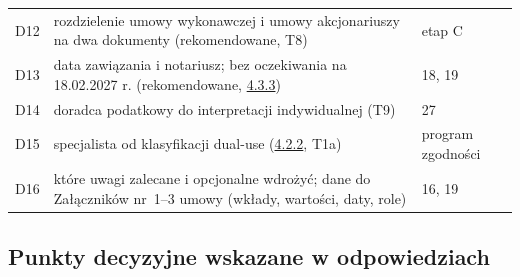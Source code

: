 \documentclass[12pt,a4paper]{report}
\begin{document}
\begin{longtable}{@{}p{1.2cm} p{9.3cm} p{3.7cm}@{}}
D12 & rozdzielenie umowy wykonawczej i umowy akcjonariuszy na dwa dokumenty (rekomendowane, T8) & etap C \\
D13 & data zawiązania i notariusz; bez oczekiwania na 18.02.2027 r. (rekomendowane, \hyperref[memo:4.3.3]{4.3.3}) & 18, 19 \\
D14 & doradca podatkowy do interpretacji indywidualnej (T9) & 27 \\
D15 & specjalista od klasyfikacji dual-use (\hyperref[memo:4.2.2]{4.2.2}, T1a) & program zgodności \\
D16 & które uwagi zalecane i opcjonalne wdrożyć; dane do Załączników nr~1--3 umowy (wkłady, wartości, daty, role) & 16, 19 \\
\bottomrule
\end{longtable}

\subsection*{Punkty decyzyjne wskazane w odpowiedziach}
\end{document}
